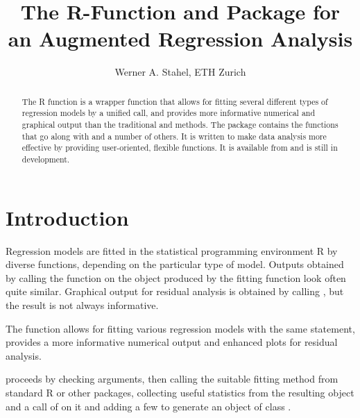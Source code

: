 \documentclass[11pt]{article}
\begin{document}

\baselineskip 15pt

\title{\vspace*{-10mm}
The R-Function  and Package  for an Augmented 
Regression Analysis}
\author{Werner A. Stahel, ETH Zurich}
\maketitle

\begin{abstract}\noindent
The R function  is a wrapper function that allows for fitting
several different types of regression models by a unified call, and
provides more informative numerical and graphical output than the 
traditional  and  methods.
The package  contains the functions that go along with 
 and a number of others.
It is written to make data analysis more effective by providing
user-oriented, flexible functions.
It is available from  and is still in development.
\end{abstract}

\section{Introduction}

Regression models are fitted in the statistical programming environment R 
by diverse functions, depending on the particular type of model.
Outputs obtained by calling the function  on the object produced
by the fitting function look often quite similar. Graphical output for
residual analysis is obtained by calling , but the result is not
always informative. 

The function  allows for fitting various regression models
with the same statement, provides a more informative numerical output
and enhanced plots for residual analysis. 

 proceeds by 
checking arguments, then calling the suitable fitting method from standard
R or other packages,
collecting useful statistics from the resulting object and a call of 
 on it and adding a few to generate an object of class
. 
\end{document}
